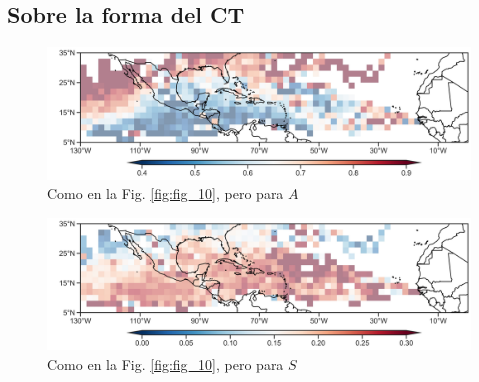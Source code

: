 \subsection{Sobre la forma del CT}
\begin{frame}
\begin{figure}
    \centering
    \includegraphics[scale = 0.25]{Images/Figures/Fig_3_27.jpeg}
    \caption{Como en la Fig. \ref{fig:fig_10}, pero para $A$}
    \label{fig:fig_A}
\end{figure}

\begin{figure}
    \centering
    \includegraphics[scale = 0.25]{Images/Figures/Fig_3_28.jpeg}
    \caption{Como en la Fig. \ref{fig:fig_10}, pero para $S$}
    \label{fig:fig_S}
\end{figure}

\end{frame}